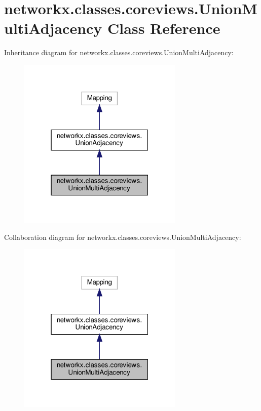 \hypertarget{classnetworkx_1_1classes_1_1coreviews_1_1UnionMultiAdjacency}{}\section{networkx.\+classes.\+coreviews.\+Union\+Multi\+Adjacency Class Reference}
\label{classnetworkx_1_1classes_1_1coreviews_1_1UnionMultiAdjacency}


Inheritance diagram for networkx.\+classes.\+coreviews.\+Union\+Multi\+Adjacency\+:
\nopagebreak
\begin{figure}[H]
\begin{center}
\leavevmode
\includegraphics[width=223pt]{classnetworkx_1_1classes_1_1coreviews_1_1UnionMultiAdjacency__inherit__graph}
\end{center}
\end{figure}


Collaboration diagram for networkx.\+classes.\+coreviews.\+Union\+Multi\+Adjacency\+:
\nopagebreak
\begin{figure}[H]
\begin{center}
\leavevmode
\includegraphics[width=223pt]{classnetworkx_1_1classes_1_1coreviews_1_1UnionMultiAdjacency__coll__graph}
\end{center}
\end{figure}
